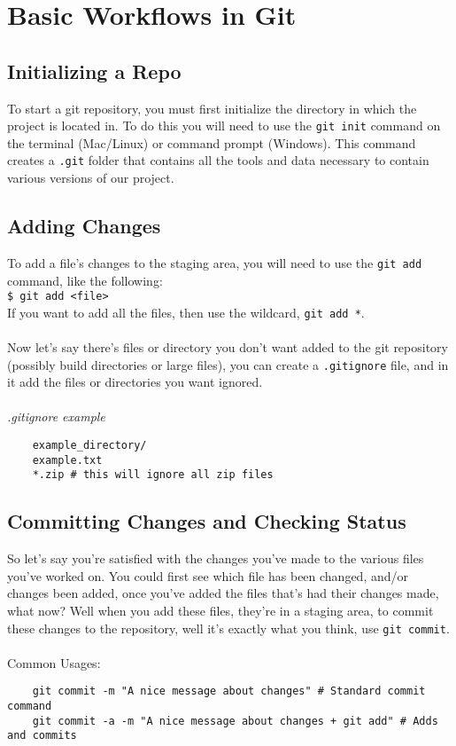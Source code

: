 \chapter{Basic Workflows in Git}

\section{Initializing a Repo}
To start a git repository, you must first initialize the directory in which the project is located in. 
To do this you will need to use the \verb!git init! command on the terminal (Mac/Linux) or command prompt (Windows). 
This command creates a \verb!.git! folder that contains all the tools and data necessary to contain various versions of our project. 

\section{Adding Changes}
To add a file's changes to the staging area, you will need to use the \verb!git add! command, like the following:
\\
\verb!$ git add <file>!
\\
If you want to add all the files, then use the wildcard, \verb!git add *!. 
\\\\
Now let's say there's files or directory you don't want added to the git repository 
(possibly build directories or large files), you can create a \verb!.gitignore! file,
and in it add the files or directories you want ignored. 
\\\\
\textit{.gitignore example}
\begin{verbatim}
    example_directory/
    example.txt
    *.zip # this will ignore all zip files
\end{verbatim}
\newpage
\section{Committing Changes and Checking Status}
So let's say you're satisfied with the changes you've made to the various files you've worked on. 
You could first see which file has been changed, and/or changes been added, once you've added the 
files that's had their changes made, what now? Well when you add these files, they're in a staging area, 
to commit these changes to the repository, well it's exactly what you think, use \verb!git commit!. 
\\\\
Common Usages: 
\begin{verbatim}
    git commit -m "A nice message about changes" # Standard commit command 
    git commit -a -m "A nice message about changes + git add" # Adds and commits
\end{verbatim}

